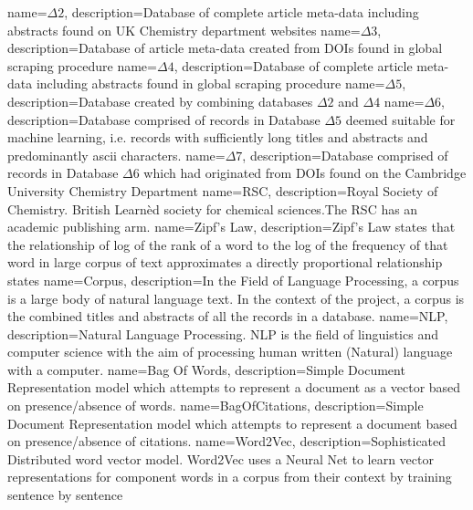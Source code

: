{
name={$\Delta2$},
description={Database of complete article meta-data including abstracts found on UK Chemistry department websites  } 
}
{
name={$\Delta3$},
description={Database of article meta-data created from DOIs found in global scraping procedure} 
} 
{
name={$\Delta4$},
description={Database of complete article meta-data including abstracts found in global scraping procedure} 
}
{
name={$\Delta5$},
description={Database created by combining databases $\Delta2$ and $\Delta 4$} 
}
{
name={$\Delta6$},
description={Database comprised of records in Database $\Delta5$ deemed suitable for machine learning, i.e. records with sufficiently long titles and abstracts and predominantly ascii characters.} 
}
{
name={$\Delta7$},
description={Database comprised of records in Database $\Delta6$ which had originated from DOIs found on the Cambridge University Chemistry Department} 
}
{
name={RSC},
description={Royal Society of Chemistry. British Learn\`ed society for chemical sciences.The RSC has an academic publishing arm.} 
}
{
name={Zipf's Law},
description={Zipf's Law states that the relationship of log of the rank of a word to the log of the frequency of that word in large corpus of text approximates a directly proportional relationship\cite{zipf} states} 
}
{
name={Corpus},
description={In the Field of Language Processing, a corpus is a large body of natural language text. In the context of the project, a corpus is the combined titles and abstracts of all the records in a database.  } 
}
{
name={NLP},
description={Natural Language Processing. NLP is the field of linguistics and computer science with the aim of processing human written (Natural) language with a computer. } 
}
{
name={Bag Of Words},
description={Simple Document Representation model which attempts to represent a document as a vector based on presence/absence of words.} 
}
{
name={BagOfCitations},
description={Simple Document Representation model which attempts to represent a document based on presence/absence of citations.} 
}
{
name={Word2Vec},
description={Sophisticated Distributed word vector model. Word2Vec uses a Neural Net to learn vector representations for component words in a corpus from their context by training sentence by sentence \cite{word2vec1}\cite{word2vec2}  } 
}
